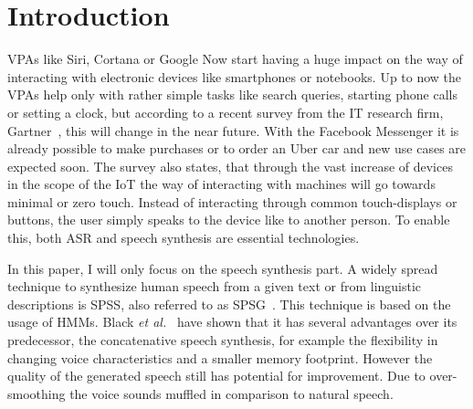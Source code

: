 

\section{Introduction}
\label{sec:introduction}

\acp{VPA} like Siri, Cortana or Google Now start having a huge impact on the way of interacting with electronic devices like smartphones or notebooks. Up to now the \acp{VPA} help only with rather simple tasks like search queries, starting phone calls or setting a clock, but according to a recent survey from the IT research firm, Gartner~\cite{gartner:assistants}, this will change in the near future. With the Facebook Messenger it is already possible to make purchases or to order an Uber car and new use cases are expected soon. The survey also states, that through the vast increase of devices in the scope of the \ac{IoT} the way of interacting with machines will go towards minimal or zero touch. Instead of interacting through common touch-displays or buttons, the user simply speaks to the device like to another person. To enable this, both \ac{ASR} and speech synthesis are essential technologies.

In this paper, I will only focus on the speech synthesis part. A widely spread technique to synthesize human speech from a given text or from linguistic descriptions is \acf{SPSS}, also referred to as \ac{SPSG}~\cite{ling:deep}. This technique is based on the usage of \acp{HMM}. Black \textit{et al.}~\cite{black:statistical} have shown that it has several advantages over its predecessor, the concatenative speech synthesis, for example the flexibility in changing voice characteristics and a smaller memory footprint. However the quality of the generated speech still has potential for improvement. Due to over-smoothing the voice sounds muffled in comparison to natural speech.


